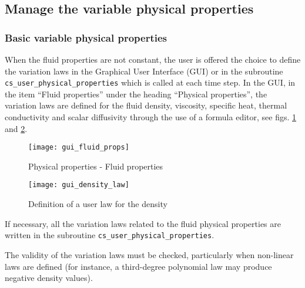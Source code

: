 {{{
\subsection{Manage the variable physical properties}
\subsubsection{Basic variable physical properties}\label{sec:usphyv}
When the fluid properties are not constant, the user is offered the choice to define the variation laws in the Graphical User Interface (GUI) or in the subroutine \texttt{cs\_user\_physical\_properties} which is called at each time step. In the GUI, in the item ``Fluid properties'' under the heading ``Physical properties'', the variation laws are defined for the fluid density, viscosity, specific heat, thermal conductivity and scalar diffusivity through the use of a formula editor, see figs. \ref{gui_fluid_props2} and \ref{fig:UL1_GUI}.
%
\begin{figure}[!ht]
\begin{center}
\texttt{[image: gui\_fluid\_props]}
\caption{Physical properties - Fluid properties}
\label{gui_fluid_props2}
\end{center}
\end{figure}
%
\begin{figure}[!ht]
\begin{center}
\texttt{[image: gui\_density\_law]}
\caption{Definition of a user law for the density}
\label{fig:UL1_GUI}
\end{center}
\end{figure}

If necessary, all the variation laws related to the fluid physical properties are written in the subroutine \texttt{cs\_user\_physical\_properties}.

The validity of the variation laws must be checked, particularly when
non-linear laws are defined (for instance, a third-degree polynomial law
may produce negative density values).

}}}
